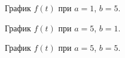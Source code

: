 \documentclass[a5paper, 10pt]{article}
\theoremstyle{definition}
\theoremstyle{plain}
\theoremstyle{remark}
\begin{document}
\begin{figure}[h!]
\caption{График $f(t)$ при $a = 1$, $b = 5$.}
\caption{График $f(t)$ при $a = 5$, $b = 1$.}
\end{figure}


\begin{figure}[h!]
\caption{График $f(t)$ при $a = 5$, $b = 5$.}
\end{figure}
\end{document}
